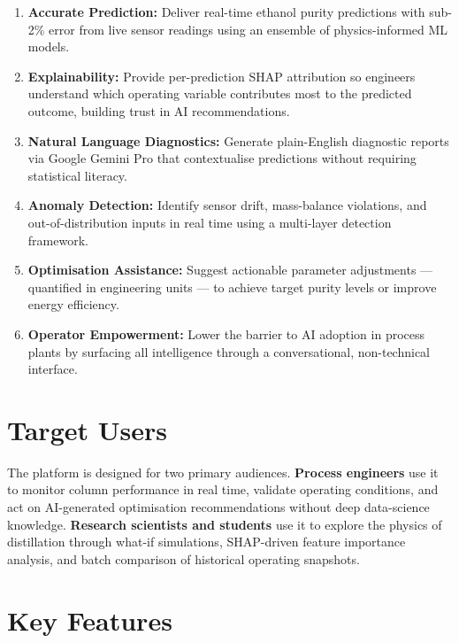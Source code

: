\documentclass[12pt,a4paper]{report}
\begin{document}
\begin{enumerate}[leftmargin=1.8cm]
  \item \textbf{Accurate Prediction:} Deliver real-time ethanol purity predictions
  with sub-2\% error from live sensor readings using an ensemble of physics-informed
  ML models.

  \item \textbf{Explainability:} Provide per-prediction SHAP attribution so engineers
  understand which operating variable contributes most to the predicted outcome,
  building trust in AI recommendations.

  \item \textbf{Natural Language Diagnostics:} Generate plain-English diagnostic
  reports via Google Gemini Pro that contextualise predictions without requiring
  statistical literacy.

  \item \textbf{Anomaly Detection:} Identify sensor drift, mass-balance violations,
  and out-of-distribution inputs in real time using a multi-layer detection framework.

  \item \textbf{Optimisation Assistance:} Suggest actionable parameter adjustments —
  quantified in engineering units — to achieve target purity levels or improve
  energy efficiency.

  \item \textbf{Operator Empowerment:} Lower the barrier to AI adoption in process
  plants by surfacing all intelligence through a conversational, non-technical
  interface.
\end{enumerate}

\section{Target Users}

The platform is designed for two primary audiences. \textbf{Process engineers} use it
to monitor column performance in real time, validate operating conditions, and act on
AI-generated optimisation recommendations without deep data-science knowledge.
\textbf{Research scientists and students} use it to explore the physics of distillation
through what-if simulations, SHAP-driven feature importance analysis, and batch
comparison of historical operating snapshots.

\section{Key Features}
\end{document}
